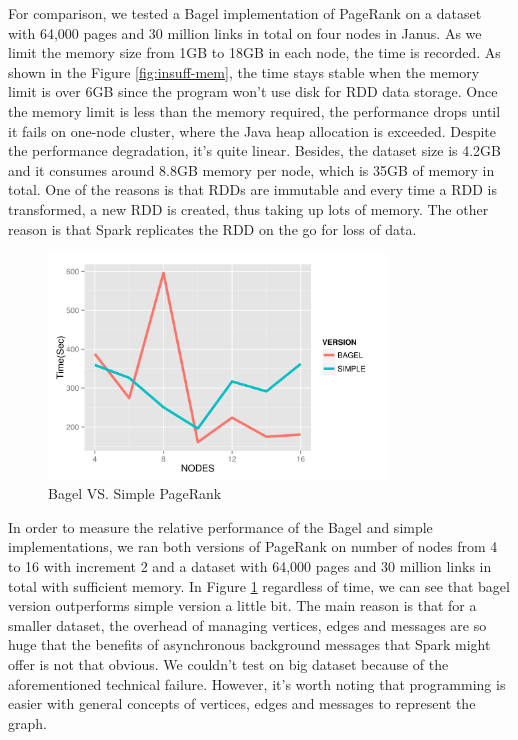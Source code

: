 \documentclass{article}
\begin{document}
For comparison, we tested a Bagel implementation of PageRank on a dataset with
64,000 pages and 30 million links in total on four nodes in Janus. As we limit
the memory size from 1GB to 18GB in each node, the time is recorded. As shown
in the Figure \ref{fig:insuff-mem}, the time stays stable when the memory limit
is over 6GB since the program won’t use disk for RDD data storage. Once the
memory limit is less than the memory required, the performance drops until it
fails on one-node cluster, where the Java heap allocation is exceeded. Despite
the performance degradation, it's quite linear. Besides, the dataset size is
4.2GB and it consumes around 8.8GB memory per node, which is 35GB of memory in
total. One of the reasons is that RDDs are immutable and every time a RDD is
transformed, a new RDD is created, thus taking up lots of memory. The other
reason is that Spark replicates the RDD on the go for loss of data.

\begin{figure}[H]
        \centering
        \includegraphics[width=90mm]{images/bagelsimple.png}
        \caption{Bagel VS. Simple PageRank}
        \label{fig:bagelsimple}
    \end{figure}

In order to measure the relative performance of the Bagel and simple
implementations, we ran both versions of PageRank on
number of nodes from 4 to 16 with increment 2 and a dataset with 64,000 pages and
30 million links in total with sufficient memory. In Figure
\ref{fig:bagelsimple} regardless of time, we can see that bagel version
outperforms simple version a little bit. The main reason is that for a smaller
dataset, the overhead of managing vertices, edges and messages are so huge that
the benefits of asynchronous background messages that Spark might offer is not
that obvious. We couldn’t test on big dataset because of the aforementioned
technical failure. However, it's worth noting that programming is easier with
general concepts of vertices, edges and messages to represent the graph.
\end{document}
